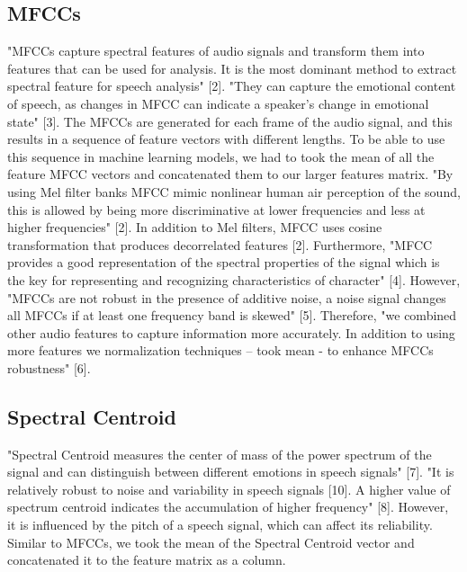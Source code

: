 \documentclass[conference]{IEEEtran}
\begin{document}
\subsection{MFCCs}
"MFCCs capture spectral features of audio signals and transform them into features that can be used for analysis. It is the most dominant method to extract spectral feature for speech analysis" [2]. "They can capture the emotional content of speech, as changes in MFCC can indicate a speaker’s change in emotional state" [3]. The MFCCs are generated for each frame of the audio signal, and this results in a sequence of feature vectors with different lengths. To be able to use this sequence in machine learning models, we had to took the mean of all the feature MFCC vectors and concatenated them to our larger features matrix.
"By using Mel filter banks MFCC mimic nonlinear human air perception of the sound, this is allowed by being more discriminative at lower frequencies and less at higher frequencies" [2]. In addition to Mel filters, MFCC uses cosine transformation that produces decorrelated features [2].
Furthermore, "MFCC provides a good representation of the spectral properties of the signal which is the key for representing and recognizing characteristics of character" [4].
However, "MFCCs are not robust in the presence of additive noise, a noise signal changes all MFCCs if at least one frequency band is skewed" [5]. Therefore, "we combined other audio features to capture information more accurately. In addition to using more features we normalization techniques – took mean - to enhance MFCCs robustness" [6].


\subsection{Spectral Centroid}
"Spectral Centroid measures the center of mass of the power spectrum of the signal and can distinguish between different emotions in speech signals" [7]. "It is relatively robust to noise and variability in speech signals [10]. A higher value of spectrum centroid indicates the accumulation of higher frequency" [8].  However, it is influenced by the pitch of a speech signal, which can affect its reliability. Similar to MFCCs, we took the mean of the Spectral Centroid vector and concatenated it to the feature matrix as a column.
\end{document}
